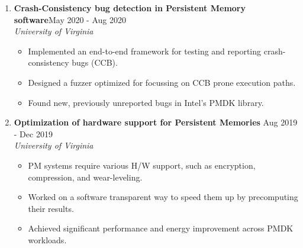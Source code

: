 \documentclass{article}
\newlength{\workexitemsep}
\newlength{\projitemsep}
\begin{document}
\begin{enumerate}
        \item \textbf{Crash-Consistency bug detection in Persistent Memory software}\hfill{}May 2020 - Aug 2020\\
    \textit{University of Virginia}\vspace{-0.15cm}
    \begin{itemize}[itemsep=\projitemsep]
            \item Implemented an end-to-end framework for testing and reporting crash-consistency bugs (CCB).
            \item Designed a fuzzer optimized for focussing on CCB prone execution paths.
            \item Found new, previously unreported bugs in Intel's PMDK library.
    \end{itemize}

        \item \textbf{Optimization of hardware support for Persistent Memories} \hfill{}Aug 2019 - Dec 2019\\
    \textit{University of Virginia}\vspace{-0.15cm}
    \begin{itemize}[itemsep=\projitemsep]
             \item PM systems require various H/W support, such as encryption, compression, and wear-leveling.
             \item Worked on a software transparent way to speed them up by precomputing their results.
             \item Achieved significant performance and energy improvement across PMDK workloads.
    \end{itemize}




\end{enumerate}
\end{document}
